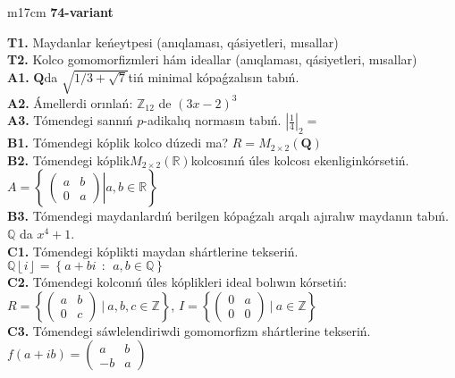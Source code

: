 \documentclass{article}
\begin{document}
\begin{tabular}{m{17cm}}
\textbf{74-variant}
\newline

\textbf{T1.} Maydanlar keńeytpesi (anıqlaması, qásiyetleri, mısallar) \\
\textbf{T2.} Kolco gomomorfizmleri hám ideallar (anıqlaması, qásiyetleri, mısallar) \\
\textbf{A1.} \(\mathbf{Q}\)da \(\sqrt{1/3 + \sqrt{7}}\)tiń minimal kópaǵzalısın tabıń. \\
\textbf{A2.} Ámellerdi orınlań: \(\mathbb{Z}_{12}\) de \((3x - 2)^{3}\) \\
\textbf{A3.} Tómendegi sannıń \(p\)-adikalıq normasın tabıń. \(|\frac{1}{4}|_{2} =\) \\
\textbf{B1.} Tómendegi kóplik kolco dúzedi ma? \(R = M_{2 \times 2}\left( \mathbf{Q} \right)\) \\
\textbf{B2.} Tómendegi kóplik\(M_{2 \times 2}\left( \mathbb{R} \right)\)kolcosınıń úles kolcosı ekenliginkórsetiń. \(A = \left\{ \left. \ \begin{pmatrix}
a & b \\
0 & a
\end{pmatrix} \right|a,b\mathbb{\in R} \right\}\) \\
\textbf{B3.} Tómendegi maydanlardıń berilgen kópaǵzalı arqalı ajıralıw maydanın tabıń. \(\mathbb{Q}\) da \(x^{4} + 1\). \\
\textbf{C1.} Tómendegi kóplikti maydan shártlerine tekseriń. \(\mathbb{Q}\left\lfloor i \right\rfloor = \left\{ a + bi\ \ :\ \ a,b\mathbb{\in Q} \right\}\) \\
\textbf{C2.} Tómendegi kolconıń úles kóplikleri ideal bolıwın kórsetiń:
\(R = \left\{ \begin{pmatrix}
a & b \\
0 & c
\end{pmatrix}\ |\ a,b,c \in \mathbb{Z} \right\}\), \(I = \left\{ \begin{pmatrix}
0 & a \\
0 & 0
\end{pmatrix}\ |\ a \in \mathbb{Z} \right\}\) \\
\textbf{C3.} Tómendegi sáwlelendiriwdi gomomorfizm shártlerine tekseriń. \(f(a + ib) = \begin{pmatrix}
a & b \\
 - b & a
\end{pmatrix}\) \\

\end{tabular}
\vspace{1cm}
\end{document}
